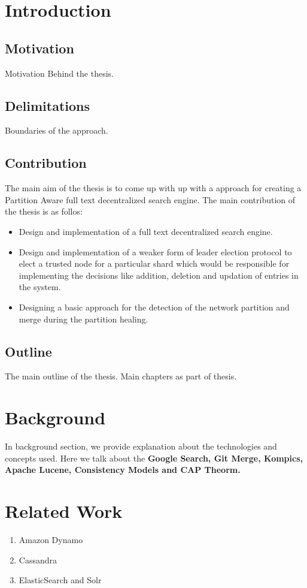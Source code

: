 \documentclass[a4paper, 11pt]{article}
\begin{document}
\section{Introduction}

\subsection{Motivation}
Motivation Behind the thesis.

\subsection{Delimitations}
Boundaries of the approach.

\subsection{Contribution}
The main aim of the thesis is to come up with up with a approach for creating a Partition Aware full text decentralized search engine. The main contribution of the thesis is as follos:

\begin{itemize}
	\item Design and implementation of a full text decentralized search engine.
	\item Design and implementation of a weaker form of leader election protocol to elect a trusted node for a particular shard which would be responsible for implementing the decisions like addition, deletion and updation of entries in the system.
	\item Designing a basic approach for the detection of the network partition and merge during the partition healing.
		
\end{itemize}

\subsection{Outline}
The main outline of the thesis. Main chapters as part of thesis.



\section{Background}
In background section, we provide explanation about the technologies and concepts used. Here we talk about the \textbf{Google Search, Git Merge, Kompics, Apache Lucene, Consistency Models and CAP Theorm.}


\section{Related Work}

\begin{enumerate}
	\item Amazon Dynamo
	\item Cassandra
	\item ElasticSearch and Solr
\end{enumerate}
\end{document}
